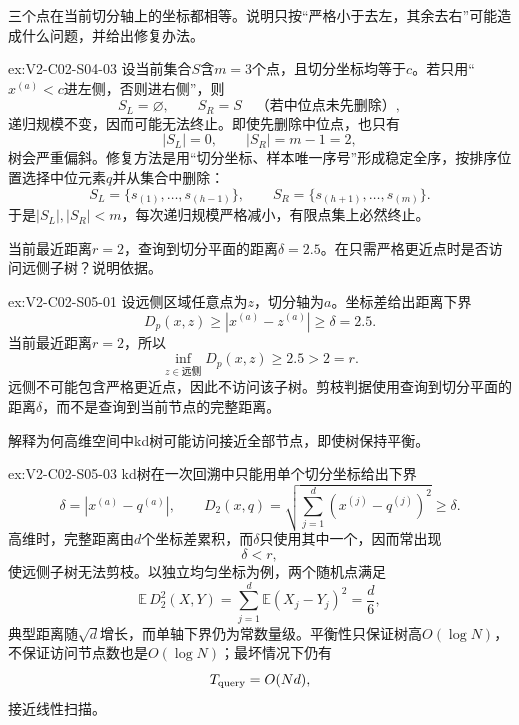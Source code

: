 \begin{SLChapterExercisePairSection}
\begin{exercise}\label{ex:V2-C02-S04-03}
三个点在当前切分轴上的坐标都相等。说明只按“严格小于去左，其余去右”可能造成什么问题，并给出修复办法。
\end{exercise}
\ifSLFullEdition
{}\label{sol:V2-C02-S04-03}
\begin{chapterexercisesolution}{ex:V2-C02-S04-03}
设当前集合$S$含$m=3$个点，且切分坐标均等于$c$。若只用“$x^{(a)}<c$进左侧，否则进右侧”，则
\[
S_L=\varnothing,
\qquad
S_R=S\quad\text{（若中位点未先删除）},
\]
递归规模不变，因而可能无法终止。即使先删除中位点，也只有
\[
|S_L|=0,
\qquad
|S_R|=m-1=2,
\]
树会严重偏斜。修复方法是用“切分坐标、样本唯一序号”形成稳定全序，按排序位置选择中位元素$q$并从集合中删除：
\[
S_L=\{s_{(1)},\ldots,s_{(h-1)}\},
\qquad
S_R=\{s_{(h+1)},\ldots,s_{(m)}\}.
\]
于是$|S_L|,|S_R|<m$，每次递归规模严格减小，有限点集上必然终止。
\end{chapterexercisesolution}
\fi

\begin{exercise}\label{ex:V2-C02-S05-01}
当前最近距离$r=2$，查询到切分平面的距离$\delta=2.5$。在只需严格更近点时是否访问远侧子树？说明依据。
\end{exercise}
\ifSLFullEdition
{}\label{sol:V2-C02-S05-01}
\begin{chapterexercisesolution}{ex:V2-C02-S05-01}
设远侧区域任意点为$z$，切分轴为$a$。坐标差给出距离下界
\[
D_p(x,z)\geq |x^{(a)}-z^{(a)}|\geq\delta=2.5.
\]
当前最近距离$r=2$，所以
\[
\inf_{z\in\text{远侧}}D_p(x,z)\geq2.5>2=r.
\]
远侧不可能包含严格更近点，因此不访问该子树。剪枝判据使用查询到切分平面的距离$\delta$，而不是查询到当前节点的完整距离。
\end{chapterexercisesolution}
\fi

\begin{exercise}\label{ex:V2-C02-S05-03}
解释为何高维空间中kd树可能访问接近全部节点，即使树保持平衡。
\end{exercise}
\ifSLFullEdition
{}\label{sol:V2-C02-S05-03}
\begin{chapterexercisesolution}{ex:V2-C02-S05-03}
kd树在一次回溯中只能用单个切分坐标给出下界
\[
\delta=|x^{(a)}-q^{(a)}|,
\qquad
D_2(x,q)=\sqrt{\sum_{j=1}^{d}(x^{(j)}-q^{(j)})^2}\geq\delta.
\]
高维时，完整距离由$d$个坐标差累积，而$\delta$只使用其中一个，因而常出现
\[
\delta<r,
\]
使远侧子树无法剪枝。以独立均匀坐标为例，两个随机点满足
\[
\mathbb E\,D_2^2(X,Y)=\sum_{j=1}^{d}\mathbb E(X_j-Y_j)^2=\frac d6,
\]
典型距离随$\sqrt d$增长，而单轴下界仍为常数量级。平衡性只保证树高$O(\log N)$，不保证访问节点数也是$O(\log N)$；最坏情况下仍有
\[
T_{\rm query}=O(Nd),
\]
接近线性扫描。
\end{chapterexercisesolution}
\fi

\end{SLChapterExercisePairSection}

